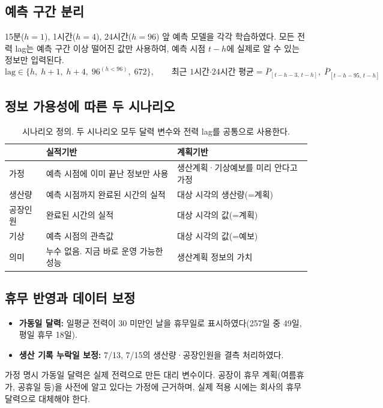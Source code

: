 \documentclass[11pt,a4paper]{article}
\begin{document}
\subsection{예측 구간 분리}
15분($h=1$), 1시간($h=4$), 24시간($h=96$) 앞 예측 모델을 각각 학습하였다. 모든 전력 lag는 예측 구간 이상 떨어진 값만 사용하여, 예측 시점 $t-h$에 실제로 알 수 있는 정보만 입력된다.
\[
\text{lag} \in \{h,\; h+1,\; h+4,\; 96^{(h<96)},\; 672\},\qquad
\text{최근 1시간·24시간 평균} = \overline{P}_{[t-h-3,\,t-h]},\; \overline{P}_{[t-h-95,\,t-h]}
\]

\subsection{정보 가용성에 따른 두 시나리오}
\begin{table}[H]
\centering\small
\begin{tabular}{p{2.3cm}p{5.6cm}p{5.6cm}}
\toprule
 & 실적기반 & 계획기반 \\
\midrule
가정 & 예측 시점에 이미 끝난 정보만 사용 & 생산계획·기상예보를 미리 안다고 가정 \\
생산량 & 예측 시점까지 완료된 시간의 실적 & 대상 시각의 생산량(=계획) \\
공장인원 & 완료된 시간의 실적 & 대상 시각의 값(=계획) \\
기상 & 예측 시점의 관측값 & 대상 시각의 값(=예보) \\
의미 & 누수 없음. 지금 바로 운영 가능한 성능 & 생산계획 정보의 가치 \\
\bottomrule
\end{tabular}
\caption{시나리오 정의. 두 시나리오 모두 달력 변수와 전력 lag를 공통으로 사용한다.}
\end{table}

\subsection{휴무 반영과 데이터 보정}
\begin{itemize}
  \item \textbf{가동일 달력:} 일평균 전력이 30 미만인 날을 휴무일로 표시하였다(257일 중 49일, 평일 휴무 18일).
  \item \textbf{생산 기록 누락일 보정:} 7/13, 7/15의 생산량·공장인원을 결측 처리하였다.
\end{itemize}

\begin{warnbox}{가정 명시}
가동일 달력은 실제 전력으로 만든 대리 변수이다. 공장이 휴무 계획(여름휴가, 공휴일 등)을 사전에 알고 있다는 가정에 근거하며, 실제 적용 시에는 회사의 휴무 달력으로 대체해야 한다.
\end{warnbox}
\end{document}
